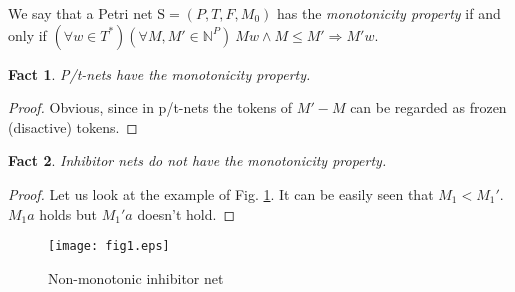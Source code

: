 \documentclass[a4paper]{llncs}
\newtheorem{fact}{Fact}
\begin{document}
\begin{definition}
\label{d261}
We say that a Petri net $\mathrm{S}=(P,T,F,M_0)$ has the \emph{monotonicity property} if and only if $(\forall w \in T^*)(\forall M,M' \in \mathbb{N}^{P}) \ Mw \land M\leq M' \Rightarrow M'w$.
\end{definition}

\begin{fact}
\label{f27}
P/t-nets have the monotonicity property.
\end{fact}

\begin{proof}
Obvious, since in p/t-nets the tokens of $M'-M$ can be regarded as frozen (disactive) tokens. 	
\end{proof}
	
\begin{fact}
\label{f28}
Inhibitor nets do not have the monotonicity property.
\end{fact}

\begin{proof}
Let us look at the example of Fig. \ref{Fig1}. It can be easily seen that $M_1<M_1'$. $M_1a$ holds but $M_1'a$ doesn't hold.	
\end{proof}

\begin{figure}[h]
\centering
\texttt{[image: fig1.eps]}
\caption{Non-monotonic inhibitor net}
\label{Fig1}
\end{figure}
\end{document}
